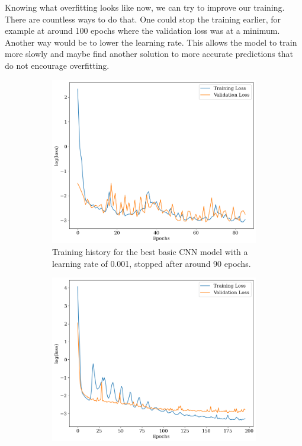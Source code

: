 Knowing what overfitting looks like now, we can try to improve our training. There are countless ways to do that. One could stop the training earlier, for example at around 100 epochs where the validation loss was at a minimum. Another way would be to lower the learning rate. This allows the model to train more slowly and maybe find another solution to more accurate predictions that do not encourage overfitting. 

\begin{figure}[H]
\centering
\begin{subfigure}{.46\textwidth}
\centering
\includegraphics[width=\textwidth]{images/Chapter4/Basic CNN/best_perf_historie.png}
\caption{Training history for the best basic CNN model with a learning rate of 0.001, stopped after around 90 epochs.} 
\label{fig:comp_learning_rates_a}
\end{subfigure}
\hspace{.6em}
\begin{subfigure}{.46\textwidth}
\centering
\includegraphics[width=\textwidth]{images/Chapter4/Basic CNN/hist_learning_rate.png}

\end{subfigure}
\end{figure}

